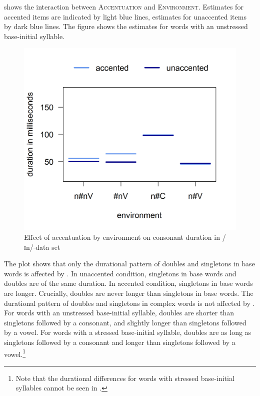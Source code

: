  shows the interaction between \textsc{Accentuation} and \textsc{Environment}. Estimates for accented items are indicated by light blue lines, estimates for unaccented items by dark blue lines. The figure shows the estimates for words with an unstressed base-initial syllable. 


	\begin{figure}
		
		
		\includegraphics [scale=0.5] {images/Experiment/InModelCompleteInterEnvAcc} 
		\caption{Effect of accentuation by environment on consonant duration in /ɪn/-data set}
		\label{fig:Env Acc In complete experiment}
	\end{figure}


The plot shows that only the durational pattern of doubles and singletons in base words is affected by . 
In unaccented condition, singletons in base words and doubles are of the same duration. In accented condition, singletons in base words are longer. Crucially, doubles are never longer than singletons in base words.
The durational pattern of doubles and singletons in complex words is not affected by . For words with an unstressed base-initial syllable, doubles are shorter than singletons followed by a consonant, and slightly longer than singletons followed by a vowel. For words with a stressed base-initial syllable, doubles are as long as singletons followed by a consonant and longer than singletons followed by a vowel.\footnote{Note that the durational differences for words with stressed base-initial syllables cannot be seen in .} 


